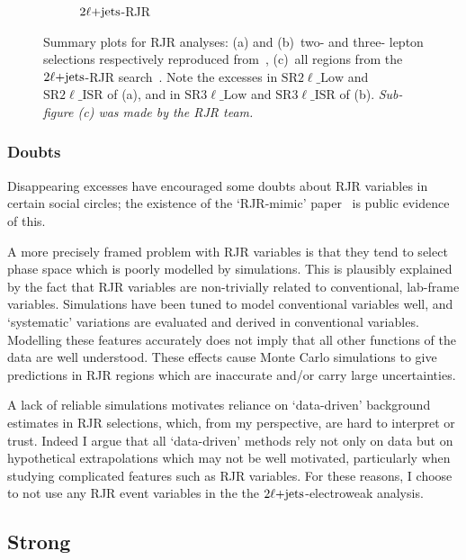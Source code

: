 \begin{figure}[tp]
\begin{subfigure}{0.8\textwidth}
    \caption{$2\ell\mathrm{+jets}$-RJR~\cite{atlas2022searches}}
\end{subfigure}
\caption{%
Summary plots for RJR analyses:
(a) and (b)~two- and three- lepton selections respectively reproduced
from~\cite{atlas_rjr_23l_SUSY_2017_03},
(c)~all regions from the $2\ell\mathrm{+jets}$-RJR search~\cite{atlas2022searches}.
Note the excesses in
$\mathrm{SR}2\ell\_\mathrm{Low}$ and $\mathrm{SR}2\ell\_\mathrm{ISR}$ of (a),
and in
$\mathrm{SR}3\ell\_\mathrm{Low}$ and $\mathrm{SR}3\ell\_\mathrm{ISR}$ of (b).
\textit{Sub-figure (c) was made by the RJR team.}
}
\label{fig:2ljets_rjr_summaries}
\end{figure}


\subsubsection{Doubts}
Disappearing excesses have encouraged some doubts about RJR variables in
certain social circles;
the existence of the `RJR-mimic' paper~\cite{atlas_rjr_mimic_SUSY_2018_06}
is public evidence of this.

A more precisely framed problem with RJR variables is that they tend to select
phase space which is poorly modelled by simulations.
This is plausibly explained by the fact that  RJR variables are non-trivially
related to conventional, lab-frame variables.
Simulations have been tuned to model conventional variables well, and
`systematic' variations are evaluated and derived in conventional variables.
Modelling these features accurately does not imply that all other functions of
the data are well understood.
These effects cause Monte Carlo simulations to give predictions in RJR regions
which are inaccurate and/or carry large uncertainties.

A lack of reliable simulations motivates reliance on `data-driven' background
estimates in RJR selections, which, from my perspective, are hard to interpret
or trust.
Indeed I argue that all `data-driven' methods rely not only on data but on
hypothetical extrapolations which may not be well motivated, particularly when
studying complicated features such as RJR variables.
For these reasons, I choose to not use any RJR event variables in the the
$2\ell\mathrm{+jets}$-electroweak analysis.


\subsection{Strong}
\label{sec:2ljets_origins_strong}


